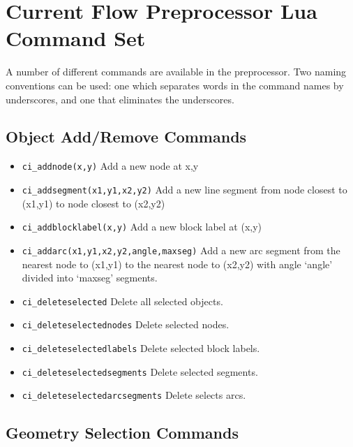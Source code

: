 ﻿\section{Current Flow Preprocessor Lua Command Set}

A number of different commands are available in the preprocessor.
Two naming conventions can be used: one which separates words in
the command names by underscores, and one that eliminates the
underscores.

\subsection{Object Add/Remove Commands}
\begin{itemize}
\item {\tt ci\_addnode(x,y)} Add a new node at x,y

\item {\tt ci\_addsegment(x1,y1,x2,y2)} Add a new line segment from node closest to
(x1,y1) to node closest to (x2,y2)

\item {\tt ci\_addblocklabel(x,y)} Add a new block label at (x,y)

\item {\tt ci\_addarc(x1,y1,x2,y2,angle,maxseg)} Add a new arc segment from the
nearest node to (x1,y1) to the nearest node to (x2,y2) with angle `angle'
divided into `maxseg' segments.

\item {\tt ci\_deleteselected} Delete all selected objects.

\item {\tt ci\_deleteselectednodes} Delete selected nodes.

\item {\tt ci\_deleteselectedlabels} Delete selected block labels.

\item {\tt ci\_deleteselectedsegments} Delete selected segments.

\item {\tt ci\_deleteselectedarcsegments} Delete selects arcs.
\end{itemize}


\subsection{Geometry Selection Commands}

